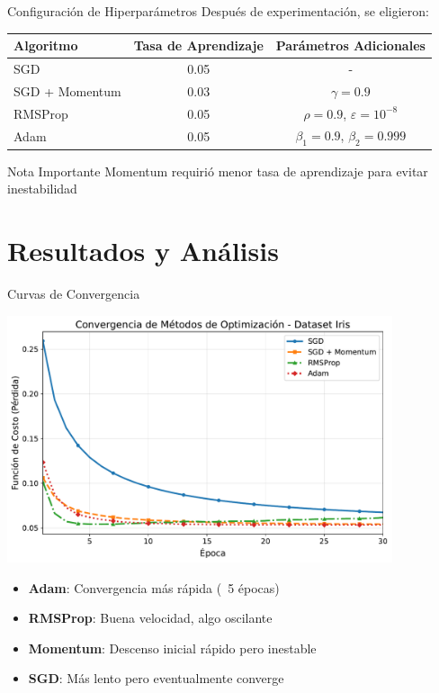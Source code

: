 \documentclass[10pt]{beamer}
\begin{document}
\begin{frame}{Configuración de Hiperparámetros}
Después de experimentación, se eligieron:

\begin{table}[ht]
\centering
\begin{tabular}{lcc}
\toprule
\textbf{Algoritmo} & \textbf{Tasa de Aprendizaje} & \textbf{Parámetros Adicionales} \\
\midrule
SGD & 0.05 & - \\
SGD + Momentum & 0.03 & $\gamma = 0.9$ \\
RMSProp & 0.05 & $\rho = 0.9$, $\varepsilon = 10^{-8}$ \\
Adam & 0.05 & $\beta_1 = 0.9$, $\beta_2 = 0.999$ \\
\bottomrule
\end{tabular}
\end{table}

\begin{alertblock}{Nota Importante}
Momentum requirió menor tasa de aprendizaje para evitar inestabilidad
\end{alertblock}
\end{frame}

\section{Resultados y Análisis}

\begin{frame}{Curvas de Convergencia}
\begin{center}
\includegraphics[width=0.85\textwidth]{curvas_convergencia.pdf}
\end{center}

\begin{itemize}
\item \textbf{Adam}: Convergencia más rápida (~5 épocas)
\item \textbf{RMSProp}: Buena velocidad, algo oscilante
\item \textbf{Momentum}: Descenso inicial rápido pero inestable
\item \textbf{SGD}: Más lento pero eventualmente converge
\end{itemize}
\end{frame}
\end{document}
